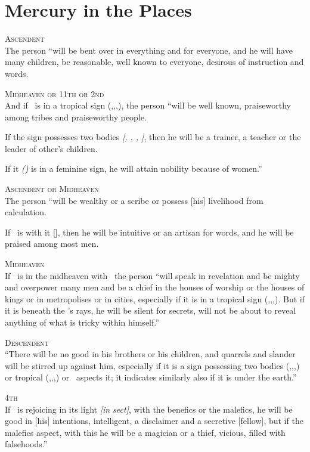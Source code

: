 \section{Mercury in the Places}

\noindent\textsc{Ascendent} \hfill \\
\indent The person ``will be bent over in everything and for everyone, and he will have many children, be reasonable, well known to everyone, desirous of instruction and words.

\noindent\textsc{Midheaven or 11th or 2nd} \hfill \\
\indent And if \Mercury\, is in a tropical sign (\Aries,\Cancer,\Libra,\Capricorn), the person ``will be well known, praiseworthy among tribes and praiseworthy people. 

If the sign possesses two bodies \textsl{[\Gemini, \Virgo, \Sagittarius, \Pisces]}, then he will be a trainer, a teacher or the leader of other's children.

If it \textsl{(\Mercury)} is in a feminine sign, he will attain nobility because of women.''

\noindent\textsc{Ascendent or Midheaven} \hfill \\
\indent The person ``will be wealthy or a scribe or possess [his] livelihood from calculation.

If \Venus\, is with it [\Mercury], then he will be intuitive or an artisan for words, and he will be praised among most men.

\noindent\textsc{Midheaven} \hfill \\
If \Mercury\, is in the midheaven with \Jupiter\, the person ``will speak in revelation and be mighty and overpower many men and be a chief in the houses of worship or the houses of kings or in metropolises or in cities, especially if it is in a tropical sign (\Aries,\Cancer,\Libra,\Capricorn). But if it is beneath the \Sun's rays, he will be silent for secrets, will not be about to reveal anything of what is tricky within himself.''

\noindent\textsc{Descendent} \hfill \\
\indent ``There will be no good in his brothers or his children, and quarrels and slander will be stirred up against him, especially if it is a sign possessing two bodies (\Gemini,\Virgo,\Sagittarius,\Pisces) or tropical (\Aries,\Cancer,\Libra,\Capricorn) or \Mars\, aspects it; it indicates similarly also if it is under the earth.''

\noindent\textsc{4th} \hfill \\
\indent If \Mercury\, is rejoicing in its light \textsl{[in sect]}, with the benefics or the malefics, he will be good in [his] intentions, intelligent, a disclaimer and a secretive [fellow], but if the malefics aspect, with this he will be a magician or a thief, vicious, filled with falsehoods.''



